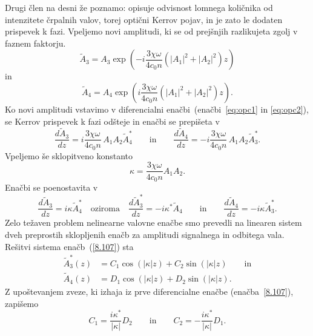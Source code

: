 Drugi člen na desni že poznamo: opisuje odvisnost lomnega količnika
od intenzitete črpalnih valov, torej optični Kerrov
pojav, in je zato le dodaten prispevek
k fazi. Vpeljemo novi amplitudi, ki se od prejšnjih razlikujeta zgolj v faznem faktorju.
\begin{equation}
\tilde{A}_3 = A_3 \exp\left(-i\frac{ 3 \chi \omega}{4 c_0 n}(|A_1|^2 + |A_2|^2) z\right)
\end{equation}
in 
\begin{equation}
\tilde{A}_4 = A_4 \exp\left(i\frac{ 3 \chi \omega}{4 c_0 n}(|A_1|^2 + |A_2|^2)z\right).
\end{equation}
Ko novi amplitudi vstavimo v diferencialni enačbi~(enačbi~\ref{eq:opc1} in 
\ref{eq:opc2}), se Kerrov prispevek k fazi odšteje
in enačbi se prepišeta v 
\begin{equation}
\frac{d\tilde{A}_{3}}{dz}=i\frac{ 3 \chi \omega}{4 c_0 n}\,
A_{1}A_{2}\tilde{A}_{4}^{*} \qquad \textrm{in} \qquad 
\frac{d\tilde{A}_{4}}{dz}=-i\frac{ 3 \chi \omega}{4 c_0 n}\,
A_{1}A_{2}\tilde{A}_{3}^*.
\label{8.105}
\end{equation}
Vpeljemo še sklopitveno konstanto
\begin{equation}
\kappa=\frac{ 3 \chi \omega}{4 c_0 n}A_1 A_2.
\label{8.106}
\end{equation}
Enačbi se poenostavita v 
\begin{equation}
\frac{d\tilde{A}_{3}}{dz}=i\kappa \tilde{A}_{4}^{*} \quad
\textrm{oziroma} \quad \frac{d\tilde{A}^*_{3}}{dz}=-i\kappa^* \tilde{A}_{4} 
\qquad \textrm{in} \qquad
\frac{d\tilde{A}_{4}}{dz}=-i\kappa \tilde{A}_{3}^*.
\label{8.107}
\end{equation}
Zelo težaven problem nelinearne valovne enačbe smo prevedli na linearen
sistem dveh preprostih sklopljenih enačb za amplitudi signalnega in
odbitega vala. Rešitvi sistema enačb~(\ref{8.107}) 
sta 
\begin{align}
\tilde{A}_3^* \left(z\right) & =  C_{1}\cos(\left|\kappa\right|z)+
C_{2}\sin(\left|\kappa\right|z)
\label{8.108} \qquad \mathrm{in}\\
\tilde{A}_4 \left(z\right) & =  D_{1}\cos(\left|\kappa\right|z)+
D_{2}\sin(\left|\kappa\right|z).
\label{8.108a}
\end{align}
Z upoštevanjem zveze, ki izhaja  iz prve diferencialne enačbe 
(enačba~\ref{8.107}), zapišemo
\begin{equation}
C_1 = \frac{i \kappa^*}{|\kappa|}D_2 \qquad
\textrm{in} \qquad 
C_2 = -\frac{i \kappa^*}{|\kappa|}D_1. 
\end{equation}

